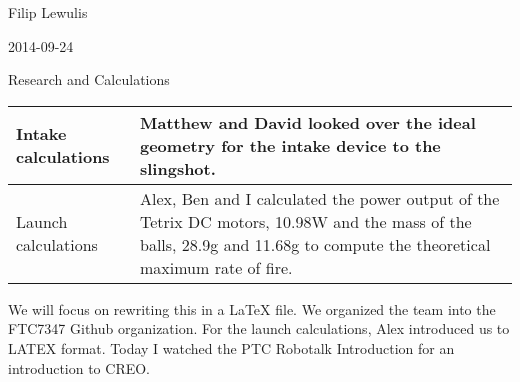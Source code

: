 Filip Lewulis

2014-09-24

Research and Calculations

\begin{tabular}{|p{5cm}|p{5cm}|}
  \hline
Intake calculations
  &
Matthew and David looked over the ideal geometry for the intake device to the slingshot.
\\
\hline
Launch calculations
  &
Alex, Ben and I calculated the power output of the Tetrix DC motors, 10.98W and the mass of the balls, 28.9g and 11.68g to compute the theoretical maximum rate of fire.
\\
  \hline
\end{tabular}

We will focus on rewriting this in a LaTeX file.
We organized the team into the FTC7347 Github organization. For the launch calculations,
Alex introduced us to LATEX format. Today I watched the PTC Robotalk Introduction for
an introduction to CREO.
